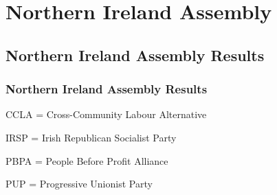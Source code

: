 \part{Northern Ireland Assembly}

\chapter{Northern Ireland Assembly Results}

\section{Northern Ireland Assembly Results}


CCLA = Cross-Community Labour Alternative


%
IRSP = Irish Republican Socialist Party

%

PBPA = People Before Profit Alliance
%

PUP = Progressive Unionist Party
%
%
%
%


